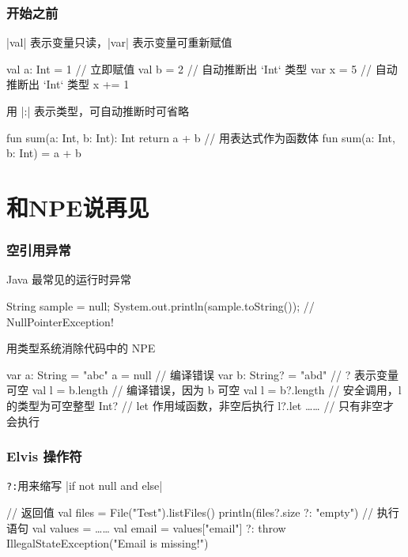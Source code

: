 \begin{frame}[fragile]
\frametitle{开始之前}
\begin{quotebox}
    |val| 表示变量只读，|var| 表示变量可重新赋值
\end{quotebox}
\begin{kotlincode}[basicstyle=\scriptsize\ttfamily]
    val a: Int = 1  // 立即赋值
    val b = 2   // 自动推断出 `Int` 类型
    var x = 5 // 自动推断出 `Int` 类型
    x += 1
\end{kotlincode}
\begin{quotebox}
    用 |:| 表示类型，可自动推断时可省略
\end{quotebox}
\begin{kotlincode}[basicstyle=\scriptsize\ttfamily]
    fun sum(a: Int, b: Int): Int {
        return a + b
    }
    // 用表达式作为函数体
    fun sum(a: Int, b: Int) = a + b
\end{kotlincode}
\end{frame}
\section{和NPE说再见}
\begin{frame}[fragile]
    \frametitle{空引用异常}
    \begin{quotebox}[yzlred]
        Java 最常见的运行时异常
    \end{quotebox}
    \begin{javacode}[basicstyle=\scriptsize\ttfamily,emph={[1]sample}]
    String sample = null;
    System.out.println(sample.toString()); // NullPointerException!
    \end{javacode}
    \begin{quotebox}
        \kotlin{} 用类型系统消除代码中的 NPE
    \end{quotebox}
    \begin{kotlincode}[basicstyle=\scriptsize\ttfamily]
    var a: String = "abc"
    a = null // 编译错误
    var b: String? = "abd" // ? 表示变量可空
    val l = b.length // 编译错误，因为 b 可空
    val l = b?.length // 安全调用，l 的类型为可空整型 Int?
    // let 作用域函数，非空后执行
    l?.let { …… // 只有非空才会执行 }
    \end{kotlincode}
\end{frame}

\begin{frame}[fragile]
    \frametitle{Elvis 操作符}
    \begin{quotebox}
        \textcolor{yzlblue}{\texttt{?:}}用来缩写 |if not null and else|
    \end{quotebox}
    \begin{kotlincode}[basicstyle=\scriptsize\ttfamily]
    // 返回值
    val files = File("Test").listFiles()
    println(files?.size ?: "empty")
    // 执行语句
    val values = ……
    val email = values["email"] ?: throw IllegalStateException("Email is missing!")
    \end{kotlincode}
\end{frame}

